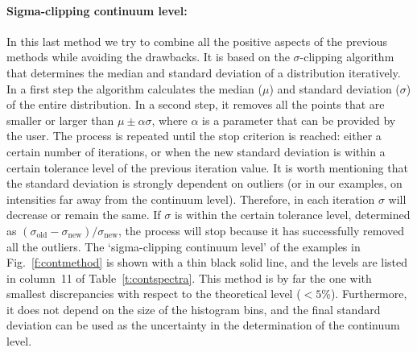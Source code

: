 \documentclass{aa}
\begin{document}
\paragraph{\textbf{Sigma-clipping continuum level}:}
In this last method we try to combine all the positive aspects of the previous methods while avoiding the drawbacks. It is based on the $\sigma$-clipping algorithm that determines the median and standard deviation of a distribution iteratively. In a first step the algorithm calculates the median ($\mu$) and standard deviation ($\sigma$) of the entire distribution. In a second step, it removes all the points that are smaller or larger than $\mu\pm\alpha\sigma$, where $\alpha$ is a parameter that can be provided by the user. The process is repeated until the stop criterion is reached: either a certain number of iterations, or when the new standard deviation is within a certain tolerance level of the previous iteration value. It is worth mentioning that the standard deviation is strongly dependent on outliers (or in our examples, on intensities far away from the continuum level). Therefore, in each iteration $\sigma$ will decrease or remain the same. If $\sigma$ is within the certain tolerance level, determined as $(\sigma_\mathrm{old}-\sigma_\mathrm{new})/\sigma_\mathrm{new}$, the process will stop because it has successfully removed all the outliers. The `sigma-clipping continuum level' of the examples in Fig.~\ref{f:contmethod} is shown with a thin black solid line, and the levels are listed in column~11 of Table~\ref{t:contspectra}. This method is by far the one with smallest discrepancies with respect to the theoretical level ($<5$\%). Furthermore, it does not depend on the size of the histogram bins, and the final standard deviation can be used as the uncertainty in the determination of the continuum level.
\end{document}
